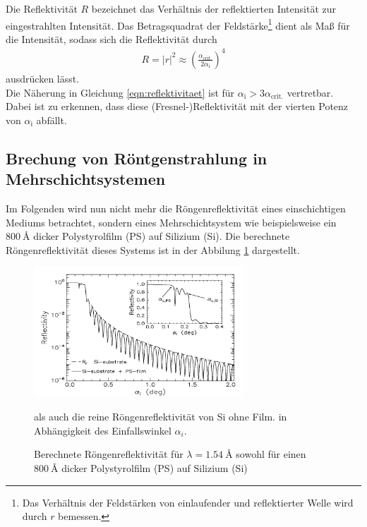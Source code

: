 Die Reflektivität $R$ bezeichnet das Verhältnis der reflektierten Intensität
zur eingestrahlten Intensität.
Das Betragsquadrat der
Feldstärke\footnote{Das Verhältnis der Feldstärken von einlaufender und
reflektierter Welle wird durch $r$ bemessen.} dient als Maß für die Intensität,
sodass sich die Reflektivität durch
\begin{align}
  R = \lvert r \rvert^{2} \approx
  \left( \frac{\alpha_{\text{crit.}}}{2\alpha_{\text{i}}} \right)^{4}
  \label{eqn:reflektivitaet}
\end{align}
ausdrücken lässt.\\
Die Näherung in Gleichung \eqref{eqn:reflektivitaet} ist für
$\alpha_{\text{i}} > 3\alpha_{\text{crit.}}$ vertretbar. Dabei ist zu erkennen,
dass diese (Fresnel-)Reflektivität mit der vierten Potenz von $\alpha_{\text{i}}$
abfällt.

\subsection{Brechung von Röntgenstrahlung in Mehrschichtsystemen}
\label{subsec:mehrschicht}
Im Folgenden wird nun nicht mehr
die Röngenreflektivität
eines einschichtigen
Mediums betrachtet, sondern eines Mehrschichtsystem wie
beispielsweise ein $\SI{800}{\angstrom}$ dicker Polystyrolfilm (PS)
auf Silizium (Si). Die berechnete Röngenreflektivität dieses
Systems ist in der Abbilung \ref{fig:mehrschicht} dargestellt.

\begin{figure}
\centering
\includegraphics[width = 0.7\textwidth]{bilder/mehrschicht_beispiel.PNG}
\caption{Berechnete Röngenreflektivität für $\lambda=\SI{1.54}{\angstrom} $ sowohl
für einen $\SI{800}{\angstrom}$ dicker Polystyrolfilm (PS)
auf Silizium (Si)} als auch die reine Röngenreflektivität von Si ohne Film.
in Abhängigkeit des Einfallswinkel $\alpha_i$.\cite{sample}
\label{fig:mehrschicht}
\end{figure}

